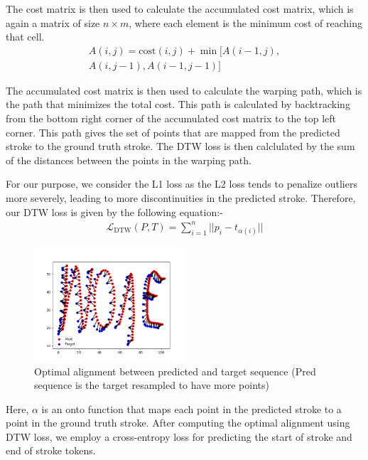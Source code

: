 \documentclass[10pt,twocolumn,letterpaper]{article}
\begin{document}
The cost matrix is then used to calculate the accumulated cost matrix, which is again a matrix of size $n \times m$, where each element is the minimum cost of reaching that cell. 
\begin{align}
    A(i, j) = \text{cost}(i, j) + \min[A(i-1, j),  \\ A(i, j-1), A(i-1, j-1)]
\end{align}

The accumulated cost matrix is then used to calculate the warping path, which is the path that minimizes the total cost. This path is calculated by backtracking from the bottom right corner of the accumulated cost matrix to the top left corner. This path gives the set of points that are mapped from the predicted stroke to the ground truth stroke. The DTW loss is then calclulated by the sum of the distances between the points in the warping path.

For our purpose, we consider the L1 loss as the L2 loss tends to penalize outliers more severely, leading to more discontinuities in the predicted stroke. Therefore, our DTW loss is given by the following equation:-
\begin{align}
    \mathcal{L}_{\text{DTW}}(P, T) = \sum_{i=1}^{n} ||p_i - t_{\alpha(i)}||
\end{align}

\begin{figure}
    \centering
    \includegraphics[width=0.5\textwidth]{latex-src/Images/DTW_map.png}
    \caption{Optimal alignment between predicted and target sequence (Pred sequence is the target resampled to have more points)}
    \label{fig:dtw}
\end{figure}

Here, $\alpha$ is an onto function that maps each point in the predicted stroke to a point in the ground truth stroke.
\newline \newline
After computing the optimal alignment using DTW loss, we employ a cross-entropy loss for predicting the start of stroke and end of stroke tokens.
\end{document}
